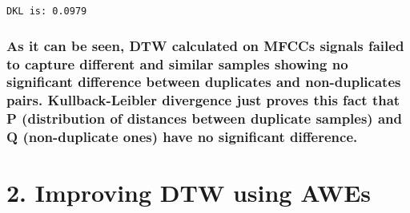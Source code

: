 \documentclass[11pt]{article}
\begin{document}
    \begin{Verbatim}[commandchars=\\\{\}]
DKL is: 0.0979

    \end{Verbatim}

    \subsubsection{As it can be seen, DTW calculated on MFCCs signals failed
to capture different and similar samples showing no significant
difference between duplicates and non-duplicates pairs. Kullback-Leibler
divergence just proves this fact that P (distribution of distances
between duplicate samples) and Q (non-duplicate ones) have no
significant
difference.}\label{as-it-can-be-seen-dtw-calculated-on-mfccs-signals-failed-to-capture-different-and-similar-samples-showing-no-significant-difference-between-duplicates-and-non-duplicates-pairs.-kullback-leibler-divergence-just-proves-this-fact-that-p-distribution-of-distances-between-duplicate-samples-and-q-non-duplicate-ones-have-no-significant-difference.}

    \section{2. Improving DTW using AWEs}\label{improving-dtw-using-awes}
\end{document}
